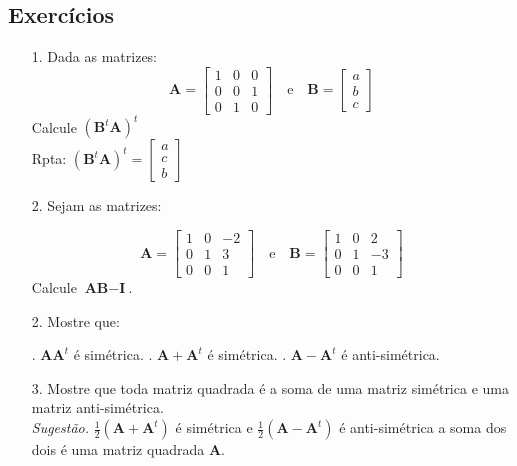 \subsection{Exercícios}
\begin{itemize}
\item[1.] Dada as matrizes:
\begin{equation*}
\textbf{A}=\begin{bmatrix}
1   & 0 & 0\\
0   & 0 & 1\\
0   & 1 & 0
\end{bmatrix} \quad \text{e} \quad \textbf{B}=\begin{bmatrix}
a  \\
b  \\
c  
\end{bmatrix}
\end{equation*} 
Calcule $(\textbf{B}^{t}\textbf{A})^{t}$\\  
Rpta: $(\textbf{B}^{t}\textbf{A})^{t}=\begin{bmatrix}
a\\
c\\
b
\end{bmatrix} $
\item[2.] Sejam as matrizes:

\begin{equation*}
\textbf{A}=\begin{bmatrix}
1   & 0 & -2\\
0   & 1 & 3\\
0   & 0 & 1
\end{bmatrix} \quad \text{e} \quad \textbf{B}=\begin{bmatrix}
1 & 0 & 2 \\
0 & 1 & -3\\
0 & 0 & 1
\end{bmatrix}
\end{equation*} 
Calcule $\textbf{A}\textbf{B}-\textbf{I}$.
\item[2.] Mostre que:

. $\textbf{A}\textbf{A}^{t}$ é simétrica.
. $ \textbf{A}+\textbf{A}^{t}$ é simétrica.
. $\textbf{A}-\textbf{A}^{t}$ é anti-simétrica.

\item[3.] Mostre que toda matriz quadrada é a soma de uma matriz simétrica e uma matriz anti-simétrica.\\
\textit{Sugestão.} $\frac{1}{2}(\textbf{A}+\textbf{A}^{t})$ é simétrica e $\frac{1}{2}(\textbf{A}-\textbf{A}^{t})$ é anti-simétrica a soma dos dois é uma matriz quadrada $\textbf{A}$. 

\end{itemize}
\newpage
